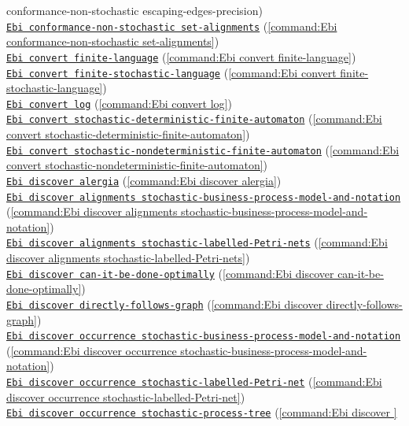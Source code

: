 {conformance-non-stochastic escaping-edges-precision})\\\null\qquad\hyperref[command:Ebi conformance-non-stochastic set-alignments]{\texttt{Ebi conformance-non-stochastic set-alignments}} (\cref{command:Ebi conformance-non-stochastic set-alignments})\\\null\qquad\hyperref[command:Ebi convert finite-language]{\texttt{Ebi convert finite-language}} (\cref{command:Ebi convert finite-language})\\\null\qquad\hyperref[command:Ebi convert finite-stochastic-language]{\texttt{Ebi convert finite-stochastic-language}} (\cref{command:Ebi convert finite-stochastic-language})\\\null\qquad\hyperref[command:Ebi convert log]{\texttt{Ebi convert log}} (\cref{command:Ebi convert log})\\\null\qquad\hyperref[command:Ebi convert stochastic-deterministic-finite-automaton]{\texttt{Ebi convert stochastic-deterministic-finite-automaton}} (\cref{command:Ebi convert stochastic-deterministic-finite-automaton})\\\null\qquad\hyperref[command:Ebi convert stochastic-nondeterministic-finite-automaton]{\texttt{Ebi convert stochastic-nondeterministic-finite-automaton}} (\cref{command:Ebi convert stochastic-nondeterministic-finite-automaton})\\\null\qquad\hyperref[command:Ebi discover alergia]{\texttt{Ebi discover alergia}} (\cref{command:Ebi discover alergia})\\\null\qquad\hyperref[command:Ebi discover alignments stochastic-business-process-model-and-notation]{\texttt{Ebi discover alignments stochastic-business-process-model-and-notation}} (\cref{command:Ebi discover alignments stochastic-business-process-model-and-notation})\\\null\qquad\hyperref[command:Ebi discover alignments stochastic-labelled-Petri-nets]{\texttt{Ebi discover alignments stochastic-labelled-Petri-nets}} (\cref{command:Ebi discover alignments stochastic-labelled-Petri-nets})\\\null\qquad\hyperref[command:Ebi discover can-it-be-done-optimally]{\texttt{Ebi discover can-it-be-done-optimally}} (\cref{command:Ebi discover can-it-be-done-optimally})\\\null\qquad\hyperref[command:Ebi discover directly-follows-graph]{\texttt{Ebi discover directly-follows-graph}} (\cref{command:Ebi discover directly-follows-graph})\\\null\qquad\hyperref[command:Ebi discover occurrence stochastic-business-process-model-and-notation]{\texttt{Ebi discover occurrence stochastic-business-process-model-and-notation}} (\cref{command:Ebi discover occurrence stochastic-business-process-model-and-notation})\\\null\qquad\hyperref[command:Ebi discover occurrence stochastic-labelled-Petri-net]{\texttt{Ebi discover occurrence stochastic-labelled-Petri-net}} (\cref{command:Ebi discover occurrence stochastic-labelled-Petri-net})\\\null\qquad\hyperref[command:Ebi discover occurrence stochastic-process-tree]{\texttt{Ebi discover occurrence stochastic-process-tree}} (\cref{command:Ebi discover }
